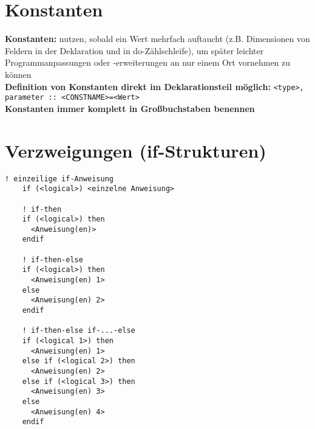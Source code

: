 \documentclass[a4paper, twocolumn]{scrarticle}
\begin{document}
    \section{Konstanten}
  \textbf{Konstanten:} nutzen, sobald ein Wert mehrfach auftaucht (z.B. Dimensionen von Feldern in der Deklaration und in do-Zählschleife), um später leichter Programmanpassungen oder -erweiterungen an nur einem Ort vornehmen zu können\\
  \textbf{Definition von Konstanten direkt im Deklarationsteil möglich:} \lstinline|<type>, parameter :: <CONSTNAME>=<Wert>| \\
  \textbf{Konstanten immer komplett in Großbuchstaben benennen}
  
  \section{Verzweigungen (if-Strukturen)}
  \begin{lstlisting}[caption={\bfseries Verzweigungen mit if}]
    ! einzeilige if-Anweisung
    if (<logical>) <einzelne Anweisung>
    
    ! if-then
    if (<logical>) then
      <Anweisung(en)>
    endif
    
    ! if-then-else
    if (<logical>) then
      <Anweisung(en) 1>
    else
      <Anweisung(en) 2>
    endif
    
    ! if-then-else if-...-else
    if (<logical 1>) then
      <Anweisung(en) 1>
    else if (<logical 2>) then
      <Anweisung(en) 2>
    else if (<logical 3>) then
      <Anweisung(en) 3>
    else
      <Anweisung(en) 4>
    endif
  \end{lstlisting}
  
\end{document}

